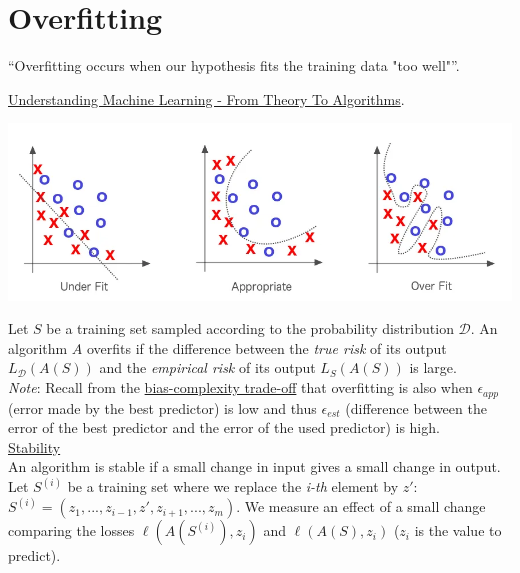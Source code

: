 \section*{Overfitting}

\label{sec:overfitting}

\vspace{5mm}

\newcommand{\quotes}[1]{``#1''}

\quotes{Overfitting occurs when our hypothesis fits the training data "too well"}. 

\underline{Understanding Machine Learning - From Theory To Algorithms}. \\

\begin{center}
\includegraphics[scale=0.4]{overfitting.png}
\end{center}

Let $S$ be a training set sampled according to the probability distribution $\mathcal{D}$.
An algorithm $A$ overfits if the difference between the \textit{true risk} of its output $L_{\mathcal{D}}(A(S))$ and the \textit{empirical risk} of its output $L_S(A(S))$ is large. \\

\textit{Note}: Recall from the \hyperref[sec:bias-complexity-trade-off]{bias-complexity trade-off} that overfitting is also when $\epsilon_{app}$ (error made by the best predictor) is low and thus $\epsilon_{est}$ (difference between the error of the best predictor and the error of the used predictor) is high. \\

\underline{Stability} \\

An algorithm is stable if a small change in input gives a small change in output. \\

Let $S^{(i)}$ be a training set where we replace the \textit{i-th} element by $z'$: $S^{(i)}=(z_1,...,z_{i-1}, z', z_{i+1}, ... , z_m)$. We measure an effect of a small change comparing the losses $\ell(A(S^{(i)}),z_i)$ and $\ell(A(S),z_i)$ ($z_i$ is the value to predict). 

